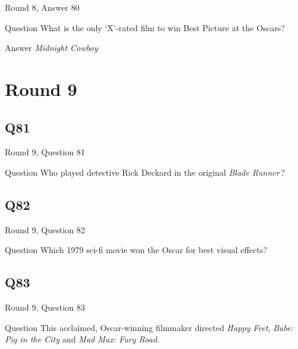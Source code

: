 \documentclass[11pt]{beamer}
\begin{document}
\begin{frame}[t]{Round 8, Answer 80}
\vspace{2em}
\begin{block}{Question}
What is the only `X'-rated film to win Best Picture at the Oscars?
\end{block}
\pause{}
\begin{block}{Answer}
\emph{Midnight Cowboy}
\end{block}
\end{frame}
    

\section{Round 9}
    

\subsection*{Q81}
\begin{frame}[t]{Round 9, Question 81}
\vspace{2em}
\begin{block}{Question}
Who played detective Rick Deckard in the original \emph{Blade Runner}\,?
\end{block}
\end{frame}
    

\subsection*{Q82}
\begin{frame}[t]{Round 9, Question 82}
\vspace{2em}
\begin{block}{Question}
Which 1979 sci-fi movie won the Oscar for best visual effects?
\end{block}
\end{frame}
    

\subsection*{Q83}
\begin{frame}[t]{Round 9, Question 83}
\vspace{2em}
\begin{block}{Question}
This acclaimed, Oscar-winning filmmaker directed \emph{Happy Feet}, \emph{Babe: Pig in the City} and \emph{Mad Max: Fury Road}.
\end{block}
\end{frame}
    
\end{document}
